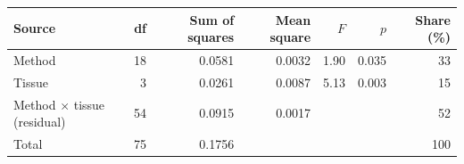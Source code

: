
\begin{tabular}{lrrrrrr}
\toprule
Source & df & Sum of squares & Mean square & $F$ & $p$ & Share (\%)\\
\midrule
Method & 18 & 0.0581 & 0.0032 & 1.90 & 0.035 & 33\\
Tissue & 3 & 0.0261 & 0.0087 & 5.13 & 0.003 & 15\\
Method $\times$ tissue (residual) & 54 & 0.0915 & 0.0017 &  &  & 52\\
Total & 75 & 0.1756 &  &  &  & 100\\
\bottomrule
\end{tabular}
